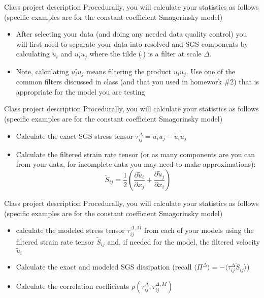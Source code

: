 \begin{frame}{Class project description}
Procedurally, you will calculate your statistics as follows (specific examples are for the constant coefficient Smagorinsky model)
\begin{itemize}
	\item After selecting your data (and doing any needed data quality control) you will first need to separate your data into resolved and SGS components by calculating $\tilde{u}_i$ and $\widetilde{u_iu_j}$ where the tilde ($\tilde{~}$) is a filter at scale $\Delta$.
	\item Note, calculating $\widetilde{u_iu_j}$ means filtering the product $u_iu_j$.  Use one of the common filters discussed in class (and that you used in homework \#2) that is appropriate for the model you are testing
	\end{itemize}
\end{frame}

\begin{frame}{Class project description}
Procedurally, you will calculate your statistics as follows (specific examples are for the constant coefficient Smagorinsky model)
\begin{itemize}
	\item Calculate the exact SGS stress tensor $\tau_{ij}^{\Delta}=\widetilde{u_iu_j}-\tilde{u}_i\tilde{u}_j$
	\item Calculate the filtered strain rate tensor (or as many components are you can from your data, for incomplete data you may need to make approximations):
\begin{equation}
\tilde{S}_{ij} = \frac{1}{2}\left( \frac{\partial \tilde{u}_i}{\partial x_j} + 
\frac{\partial \tilde{u}_j}{\partial x_i}\right) \nonumber
\end{equation}
	\end{itemize}
\end{frame}

\begin{frame}{Class project description}
Procedurally, you will calculate your statistics as follows (specific examples are for the constant coefficient Smagorinsky model)
\begin{itemize}
	\item calculate the modeled stress tensor $\tau_{ij}^{\Delta,M}$ from each of your models using the filtered strain rate tensor $\tilde{S}_{ij}$ and, if needed for the model, the filtered velocity $\tilde{u}_i$
	\item Calculate the exact and modeled SGS dissipation (recall $\langle \Pi^{\Delta} \rangle = -\langle \tau_{ij}^{\Delta}\tilde{S}_{ij} \rangle$)
	\item Calculate the correlation coefficients $\rho\left( \tau_{ij}^{\Delta},\tau_{ij}^{\Delta,M} \right)$
	\end{itemize}
\end{frame}

